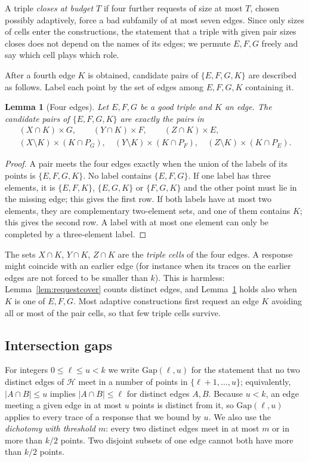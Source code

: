 \documentclass[11pt]{article}
\numberwithin{equation}{section}
\newtheorem{lemma}[theorem]{Lemma}
\theoremstyle{definition}
\theoremstyle{remark}
\newcommand{\HH}{\mathcal H}
\newcommand{\Gap}{\mathrm{Gap}}
\begin{document}
A triple \emph{closes at budget $T$} if four further requests of size at
most $T$, chosen possibly adaptively, force a bad subfamily of at most
seven edges. Since only sizes of cells enter the constructions, the
statement that a triple with given pair sizes closes does not depend on
the names of its edges; we permute $E,F,G$ freely and say which cell
plays which role.

After a fourth edge $K$ is obtained, candidate pairs of $\{E,F,G,K\}$
are described as follows. Label each point by the set of edges among
$E,F,G,K$ containing it.

\begin{lemma}[Four edges]\label{lem:foursets}
Let $E,F,G$ be a good triple and $K$ an edge. The candidate pairs of
$\{E,F,G,K\}$ are exactly the pairs in
\begin{gather*}
 (X\cap K)\times G,\qquad (Y\cap K)\times F,\qquad (Z\cap K)\times E,\\
 (X\setminus K)\times(K\cap P_G),\quad
 (Y\setminus K)\times(K\cap P_F),\quad
 (Z\setminus K)\times(K\cap P_E).
\end{gather*}
\end{lemma}
\begin{proof}
A pair meets the four edges exactly when the union of the labels of its
points is $\{E,F,G,K\}$. No label contains $\{E,F,G\}$. If one label has
three elements, it is $\{E,F,K\}$, $\{E,G,K\}$ or $\{F,G,K\}$ and the
other point must lie in the missing edge; this gives the first row. If
both labels have at most two elements, they are complementary
two-element sets, and one of them contains $K$; this gives the second
row. A label with at most one element can only be completed by a
three-element label.
\end{proof}

The sets $X\cap K$, $Y\cap K$, $Z\cap K$ are the \emph{triple cells} of
the four edges. A response might coincide with an earlier edge (for
instance when its traces on the earlier edges are not forced to be smaller
than $k$). This is harmless: Lemma~\ref{lem:requestcover} counts distinct
edges, and Lemma~\ref{lem:foursets} holds also when $K$ is one of $E,F,G$. Most adaptive constructions first request an edge $K$
avoiding all or most of the pair cells, so that few triple cells
survive.

\subsection{Intersection gaps}
For integers $0\le\ell\le u<k$ we write $\Gap(\ell,u)$ for the statement
that no two distinct edges of $\HH$ meet in a number of points in
$\{\ell+1,\dots,u\}$; equivalently, $|A\cap B|\le u$ implies
$|A\cap B|\le\ell$ for distinct edges $A,B$. Because $u<k$, an edge
meeting a given edge in at most $u$ points is distinct from it, so
$\Gap(\ell,u)$ applies to every trace of a response that we bound by
$u$. We also use the \emph{dichotomy with threshold $m$}: every two
distinct edges meet in at most $m$ or in more than $k/2$ points. Two
disjoint subsets of one edge cannot both have more than $k/2$ points.
\end{document}
